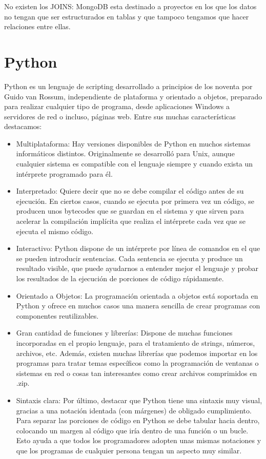 \documentclass[a4paper, 12pt]{book}
\begin{document}
	No existen los JOINS: MongoDB esta destinado a proyectos en los que los datos no tengan que  ser estructurados en tablas y que tampoco tengamos que hacer relaciones entre ellas.


\section{Python} 
\label{sec:Python}
Python es un lenguaje de scripting desarrollado a principios de los noventa por Guido van Rossum, independiente de plataforma y orientado a objetos, preparado para realizar cualquier tipo de programa, desde aplicaciones Windows a servidores de red o incluso, páginas web. Entre sus muchas características destacamos:

\begin{itemize}
\item Multiplataforma: Hay versiones disponibles de Python en muchos sistemas informáticos distintos. Originalmente se desarrolló para Unix, aunque cualquier sistema es compatible con el lenguaje siempre y cuando exista un intérprete programado para él.

\item Interpretado: Quiere decir que no se debe compilar el código antes de su ejecución. En ciertos casos, cuando se ejecuta por primera vez un código, se producen unos bytecodes que se guardan en el sistema y que sirven para acelerar la compilación implícita que realiza el intérprete cada vez que se ejecuta el mismo código.

\item Interactivo: Python dispone de un intérprete por línea de comandos en el que se pueden introducir sentencias. Cada sentencia se ejecuta y produce un resultado visible, que puede ayudarnos a entender mejor el lenguaje y probar los resultados de la ejecución de porciones de código rápidamente.

\item Orientado a Objetos: La programación orientada a objetos está soportada en Python y ofrece en muchos casos una manera sencilla de crear programas con componentes reutilizables.

\item Gran cantidad de funciones y librerías: Dispone de muchas funciones incorporadas en el propio lenguaje, para el tratamiento de strings, números, archivos, etc. Además, existen muchas librerías que podemos importar en los programas para tratar temas específicos como la programación de ventanas o sistemas en red o cosas tan interesantes como crear archivos comprimidos en .zip.

\item Sintaxis clara: Por último, destacar que Python tiene una sintaxis muy visual, gracias a una notación identada (con márgenes) de obligado cumplimiento. Para separar las porciones de código en Python se debe tabular hacia dentro, colocando un margen al código que iría dentro de una función o un bucle. Esto ayuda a que todos los programadores adopten unas mismas notaciones y que los programas de cualquier persona tengan un aspecto muy similar.
\end{itemize}
\end{document}

